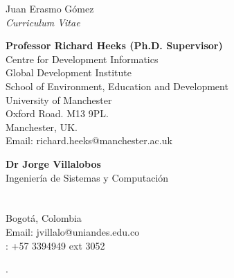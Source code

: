 \documentclass[10pt]{article}
\begin{document}
\begin{cv}{Juan Erasmo Gómez\\{\large \itshape Curriculum Vitae}}
\begin{cvlist}{}
  \item \textbf{Professor Richard Heeks (Ph.D. Supervisor)}\\
    Centre for Development Informatics\\
    Global Development Institute\\
    School of Environment, Education and Development\\
    University of Manchester\\
    Oxford Road. M13 9PL.\\
    Manchester, UK.\\
    Email: richard.heeks@manchester.ac.uk
    
  \item \textbf{Dr Jorge Villalobos}\\
     Ingeniería de Sistemas y Computación \\
    \\
    \uniandes\\
    Bogotá, Colombia\\
    Email: jvillalo@uniandes.edu.co\\
    : +57 3394949 ext 3052
  \end{cvlist}

  \begin{cvlist}{}
  \item {}.
  \end{cvlist}
  

\end{cv}
\end{document}
